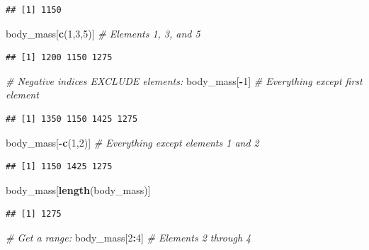 \documentclass[
]{article}
\newenvironment{Shaded}{\begin{snugshade}}{\end{snugshade}}
\newcommand{\CommentTok}[1]{\textcolor[rgb]{0.56,0.35,0.01}{\textit{#1}}}
\newcommand{\DecValTok}[1]{\textcolor[rgb]{0.00,0.00,0.81}{#1}}
\newcommand{\FunctionTok}[1]{\textcolor[rgb]{0.13,0.29,0.53}{\textbf{#1}}}
\newcommand{\NormalTok}[1]{#1}
\newcommand{\SpecialCharTok}[1]{\textcolor[rgb]{0.81,0.36,0.00}{\textbf{#1}}}
\begin{document}
\begin{verbatim}
## [1] 1150
\end{verbatim}

\begin{Shaded}
\begin{Highlighting}[]
\NormalTok{body\_mass[}\FunctionTok{c}\NormalTok{(}\DecValTok{1}\NormalTok{,}\DecValTok{3}\NormalTok{,}\DecValTok{5}\NormalTok{)]   }\CommentTok{\# Elements 1, 3, and 5}
\end{Highlighting}
\end{Shaded}

\begin{verbatim}
## [1] 1200 1150 1275
\end{verbatim}

\begin{Shaded}
\begin{Highlighting}[]
\CommentTok{\# Negative indices EXCLUDE elements:}
\NormalTok{body\_mass[}\SpecialCharTok{{-}}\DecValTok{1}\NormalTok{]         }\CommentTok{\# Everything except first element}
\end{Highlighting}
\end{Shaded}

\begin{verbatim}
## [1] 1350 1150 1425 1275
\end{verbatim}

\begin{Shaded}
\begin{Highlighting}[]
\NormalTok{body\_mass[}\SpecialCharTok{{-}}\FunctionTok{c}\NormalTok{(}\DecValTok{1}\NormalTok{,}\DecValTok{2}\NormalTok{)]    }\CommentTok{\# Everything except elements 1 and 2}
\end{Highlighting}
\end{Shaded}

\begin{verbatim}
## [1] 1150 1425 1275
\end{verbatim}

\begin{Shaded}
\begin{Highlighting}[]
\NormalTok{body\_mass[}\FunctionTok{length}\NormalTok{(body\_mass)] }
\end{Highlighting}
\end{Shaded}

\begin{verbatim}
## [1] 1275
\end{verbatim}

\begin{Shaded}
\begin{Highlighting}[]
\CommentTok{\# Get a range:}
\NormalTok{body\_mass[}\DecValTok{2}\SpecialCharTok{:}\DecValTok{4}\NormalTok{]        }\CommentTok{\# Elements 2 through 4}
\end{Highlighting}
\end{Shaded}
\end{document}
